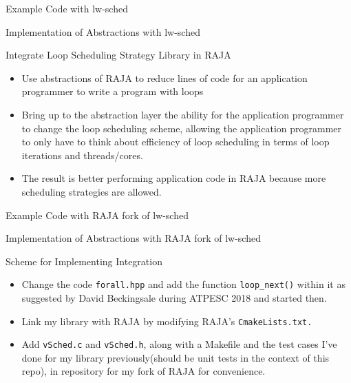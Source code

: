 \documentclass{beamer}
\begin{document}
\begin{frame}{Example Code with lw-sched}
\begin{figure}[ht!] 

\end{figure}
\end{frame}

\begin{frame}{Implementation of Abstractions with lw-sched}
\begin{figure}[ht!] 

\end{figure}
\end{frame}

\begin{frame}{Integrate Loop Scheduling Strategy Library in RAJA}
\begin{itemize}
\item Use abstractions of RAJA to reduce lines of code for an application programmer to write a program with loops 
\item Bring up to the abstraction layer the ability for the application programmer to change the loop scheduling scheme, allowing the application programmer to only have to think about efficiency of loop scheduling in terms of loop iterations and threads/cores.  
\item The result is better performing application code in RAJA because more scheduling strategies are allowed. 
\end{itemize} 
\end{frame}

\begin{frame}{Example Code with RAJA fork of lw-sched}
\begin{figure}[ht!] 

\end{figure}
\end{frame}

\begin{frame}{Implementation of Abstractions with RAJA fork of lw-sched}
\begin{figure}[ht!] 

\end{figure}
\end{frame}

\begin{frame}{Scheme for Implementing Integration}
\begin{itemize}
\item Change the code {\tt forall.hpp} and add the function {\tt loop\_next()} within it as suggested by David Beckingsale during ATPESC 2018 and started then.
\item Link my library with RAJA by modifying RAJA's {\tt CmakeLists.txt.}
\item Add {\tt vSched.c} and {\tt vSched.h}, along with a Makefile and the test cases I've done for my library previously(should be unit tests in the context of this repo), in repository for my fork of RAJA for convenience.
\end{itemize}
\end{frame}
\end{document}

